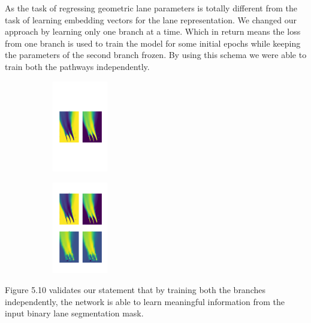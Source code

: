 As the task of regressing geometric lane parameters is totally different from the task of learning embedding vectors for the lane representation. We changed our approach by learning only one branch at a time. Which in return means the loss from one branch is used to train the model for some initial epochs while keeping the parameters of the second branch frozen.  By using this schema we were able to train both the pathways independently. 

 \begin{figure}[h]
      \caption{Activation maps of convolutional layers (a) embedding pathway (b) regression pathway, while training them independently}
        \centering
        \begin{subfigure}{0.6\textwidth}
        \includegraphics[width=1\linewidth, height=4cm]{images/activation_embedding.png} 
        \caption{}
        \label{fig:subim1}
        \end{subfigure}
        \begin{subfigure}{0.6\textwidth}
        \includegraphics[width=1\linewidth,height=4cm]{images/activation_regression.png}
        \caption{}
        \label{fig:subim2}
        \end{subfigure}
        \end{figure}

Figure 5.10 validates our statement that by training both the branches independently, the network is able to learn meaningful information from the input binary lane segmentation mask.

